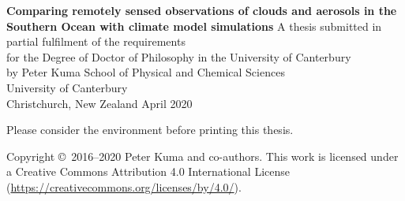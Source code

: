 \thispagestyle{empty}
\begin{center}
\null
\vfill
\huge
\sffamily
\textbf{Comparing remotely sensed observations of clouds and
aerosols in the Southern Ocean with climate model
simulations}
\normalfont
\vfill
\Large
A thesis submitted in partial fulfilment of the requirements\\
for the Degree of Doctor of Philosophy
in the University of Canterbury\\
by Peter Kuma
\vfill
School of Physical and Chemical Sciences\\
University of Canterbury\\
Christchurch, New Zealand
\vfill
April 2020
\vfill
\end{center}
\clearpage
\thispagestyle{empty}
\normalfont
\null
\vfill
\noindent
\begin{center}
\large
Please consider the environment before printing this thesis.
\end{center}
\vfill
\noindent
Copyright \copyright\ 2016--2020 Peter Kuma and co-authors. This work is licensed under a Creative Commons Attribution 4.0 International License (\url{https://creativecommons.org/licenses/by/4.0/}).
